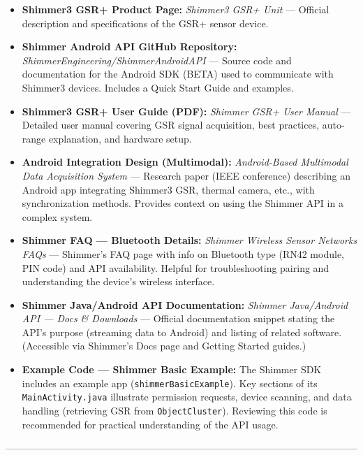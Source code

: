 {{\begin{itemize}
\item \textbf{Shimmer3 GSR+ Product Page:} \textit{Shimmer3 GSR+ Unit} --- Official
  description and specifications of the GSR+ sensor
  device\cite{ref1}\cite{ref2}.
\item \textbf{Shimmer Android API GitHub Repository:}
  \textit{ShimmerEngineering/ShimmerAndroidAPI} --- Source code and
  documentation for the Android SDK (BETA) used to communicate with
  Shimmer3
  devices\cite{ref8}.
  Includes a Quick Start Guide and examples.
\item \textbf{Shimmer3 GSR+ User Guide (PDF):} \textit{Shimmer GSR+ User Manual} ---
  Detailed user manual covering GSR signal acquisition, best practices,
  auto-range explanation, and hardware
  setup\cite{ref42}\cite{ref43}.
\item \textbf{Android Integration Design (Multimodal):} \textit{Android-Based Multimodal
  Data Acquisition System} --- Research paper (IEEE conference)
  describing an Android app integrating Shimmer3 GSR, thermal camera,
  etc., with synchronization
  methods\cite{ref51}\cite{ref35}.
  Provides context on using the Shimmer API in a complex system.
\item \textbf{Shimmer FAQ --- Bluetooth Details:} \textit{Shimmer Wireless Sensor
  Networks FAQs} --- Shimmer's FAQ page with info on Bluetooth type (RN42
  module, PIN code) and API
  availability\cite{ref9}\cite{ref20}.
  Helpful for troubleshooting pairing and understanding the device's
  wireless interface.
\item \textbf{Shimmer Java/Android API Documentation:} \textit{Shimmer Java/Android API
  --- Docs & Downloads} --- Official documentation snippet stating the
  API's purpose (streaming data to Android) and listing of related
  software. (Accessible via Shimmer's Docs page and Getting Started
  guides.)
\item \textbf{Example Code --- Shimmer Basic Example:} The Shimmer SDK includes an
  example app (\texttt{shimmerBasicExample}). Key sections of its
  \texttt{MainActivity.java} illustrate permission
  requests\cite{ref13},
  device
  scanning\cite{ref38},
  and data handling (retrieving GSR from
  \texttt{ObjectCluster})\cite{ref23}\cite{ref29}.
  Reviewing this code is recommended for practical understanding of the
  API usage.

\end{itemize}
------------------------------------------------------------------------------------------------------------

}}
